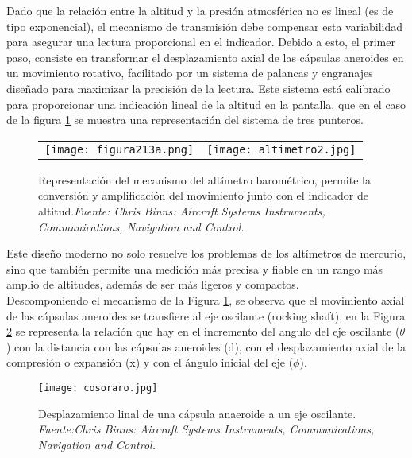 Dado que la relación entre la altitud y la presión atmosférica no es lineal (es de tipo exponencial), el mecanismo de transmisión debe compensar esta variabilidad para asegurar una lectura proporcional en el indicador. Debido a esto, el primer paso, consiste en transformar el desplazamiento axial de las cápsulas aneroides en un movimiento rotativo, facilitado por un sistema de palancas y engranajes diseñado para maximizar la precisión de la lectura. Este sistema está calibrado para proporcionar una indicación lineal de la altitud en la pantalla, que en el caso de la figura \ref{fig:altimetro} se muestra una representación del sistema de tres punteros.\\


\begin{figure}[H]
    \centering
    \begin{tabular}{c c}  
        \texttt{[image: figura213a.png]} & 
       \texttt{[image: altimetro2.jpg]}\\
    \end{tabular}

    \caption{\centering Representación del mecanismo del altímetro barométrico, permite la conversión y amplificación del movimiento junto con el indicador de altitud.\textit{Fuente: Chris Binns: Aircraft Systems Instruments, Communications, Navigation and Control.}}
    \label{fig:altimetro}
    
\end{figure}

Este diseño moderno no solo resuelve los problemas de los altímetros de mercurio, sino que también permite una medición más precisa y fiable en un rango más amplio de altitudes, además de ser más ligeros y compactos.\\

Descomponiendo el mecanismo de la Figura \ref{fig:altimetro}, se observa que el movimiento axial de las cápsulas aneroides se transfiere al eje oscilante (rocking shaft), en la Figura \ref{fig:yepaa} se representa la relación que hay en el incremento del angulo del eje oscilante (\(\theta\)) con la distancia con las cápsulas aneroides (d), con el desplazamiento axial de la compresión o expansión (x) y con el ángulo inicial del eje (\(\phi\)).

\begin{figure}[H]
    \centering
    \texttt{[image: cosoraro.jpg]}
    \caption{\centering Desplazamiento linal de una cápsula anaeroide a un eje oscilante. \textit{ Fuente:Chris Binns: Aircraft Systems Instruments, Communications, Navigation and Control.}}
    \label{fig:yepaa}
\end{figure}


